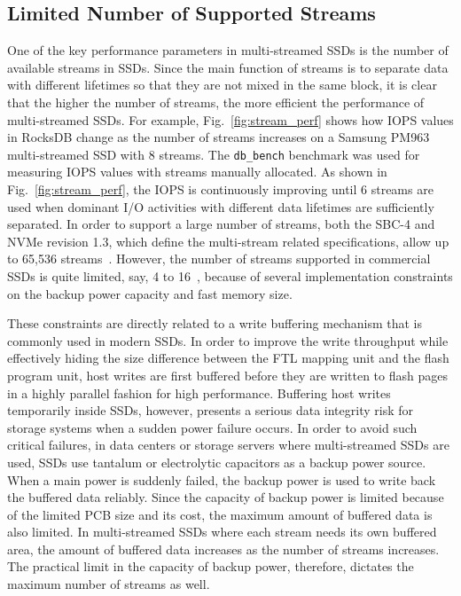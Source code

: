 \vspace{-10pt}
\subsection{Limited Number of Supported Streams}
One of the key performance parameters in multi-streamed SSDs is the number of 
available streams in SSDs.  
Since the main function of  streams is to separate data with different lifetimes 
so that they are not mixed in the same block, it is clear that the 
higher the number of streams, the more efficient the performance of multi-streamed SSDs.
For example, Fig.~\ref{fig:stream_perf} shows how IOPS values in RocksDB
change as the number of streams increases on a Samsung PM963 multi-streamed SSD
with 8 streams.
The \texttt{db\_bench} benchmark was used for measuring IOPS values with streams
manually allocated.
As shown in Fig.~\ref{fig:stream_perf}, the IOPS is continuously improving
until 6 streams are used when dominant I/O activities with different data lifetimes
are sufficiently separated.
In order to support a large number of streams, both the SBC-4 and NVMe revision 1.3, which define the 
multi-stream related specifications, allow up to 65,536 streams~\cite{T10, NVMe}.  
However, the number of streams supported in
commercial SSDs is quite limited, say, 4 to 16~\cite{MultiStream, Level, AutoStream}, 
because of several implementation constraints on the backup power capacity and fast memory size.

These constraints are directly related to a write buffering mechanism that is 
commonly used in modern SSDs.   In order to improve the write throughput while 
effectively hiding the size difference
between the FTL mapping unit and the flash program unit, host writes are first buffered 
before they are written to flash pages in a highly parallel fashion for high performance.  
Buffering host writes temporarily inside SSDs, however, presents a serious data integrity 
risk for storage systems when a sudden power failure occurs.  
In order to avoid such critical failures, in data centers or storage servers 
where multi-streamed SSDs are used,
SSDs use tantalum or electrolytic capacitors as a backup power source.  
When a main power is suddenly failed, the backup power is used to write back the
buffered data reliably.  
Since the capacity of backup power is limited because of the limited PCB size and 
its cost, the maximum amount of buffered data is also limited.  
In multi-streamed SSDs where
each stream needs its own buffered area, the amount of buffered data increases 
as the number of streams increases.  
The practical limit in the capacity of backup power, therefore, dictates the maximum
number of streams as well.


